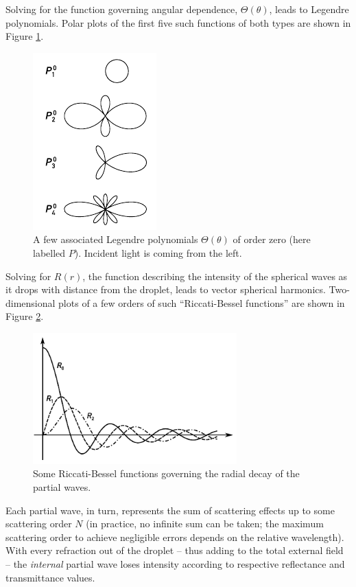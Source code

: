\documentclass[11.5pt,oneside]{book}
\begin{document}
Solving for the function governing angular dependence, $\Theta(\theta)$, leads
to Legendre polynomials. Polar plots of the first five such functions of
both types are shown in Figure \ref{fig:angularfuncs}. 

\begin{figure}
    \centering
    \includegraphics[height=0.5\textheight]{img/scattering/radials.pdf}
    \caption{A few associated Legendre polynomials $\Theta(\theta)$ of order zero (here labelled $P$). Incident light is coming from the
    left.}
    \label{fig:angularfuncs}
\end{figure}

Solving for $R(r)$, the function describing the intensity of the spherical waves
as it drops with distance from the droplet, leads to vector spherical harmonics.
Two-dimensional plots of a few orders of such ``Riccati-Bessel functions'' are
shown in Figure \ref{fig:besselfuncs}.

\begin{figure}
    \centering
    \includegraphics[width=0.7\textwidth]{img/scattering/bessel.pdf}
    \caption{Some Riccati-Bessel functions governing the radial decay of the partial
    waves.}
    \label{fig:besselfuncs}
\end{figure}

Each partial wave, in turn, represents the sum of scattering effects up to some
scattering order $N$ (in practice, no infinite sum can be taken; the maximum
scattering order to achieve negligible errors depends on the relative
wavelength). With every refraction out of the droplet -- thus adding to the
total external field -- the \emph{internal} partial wave loses intensity
according to respective reflectance and transmittance values.
\end{document}
